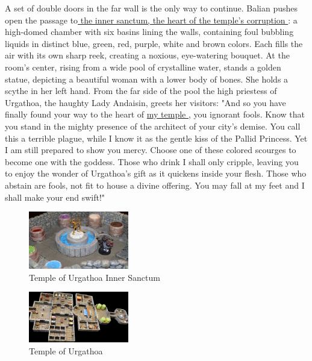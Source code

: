 A set of double doors in the far wall is the only way to continue. Balian pushes open the passage to\hyperref[fig:Temple-of-Urgathoa-Inner-Sanctum-523051443 ]{ the inner sanctum, the heart of the temple's corruption } : a high-domed chamber with six basins lining the walls, containing foul bubbling liquids in distinct blue, green, red, purple, white and brown colors. Each fills the air with its own sharp reek, creating a noxious, eye-watering bouquet. At the room's center, rising from a wide pool of crystalline water, stands a golden statue, depicting a beautiful woman with a lower body of bones. She holds a scythe in her left hand. From the far side of the pool the high priestess of Urgathoa, the haughty Lady Andaisin, greets her visitors: "And so you have finally found your way to the heart of \hyperref[fig:Temple-of-Urgathoa-523050074]{ my temple } , you ignorant fools. Know that you stand in the mighty presence of the architect of your city's demise. You call this a terrible plague, while I know it as the gentle kiss of the Pallid Princess. Yet I am still prepared to show you mercy. Choose one of these colored scourges to become one with the goddess. Those who drink I shall only cripple, leaving you to enjoy the wonder of Urgathoa's gift as it quickens inside your flesh. Those who abstain are fools, not fit to house a divine offering. You may fall at my feet and I shall make your end swift!" \\

\begin{figure}[h]
	\centering
	\includegraphics[width=0.39\textwidth]{images/Temple-of-Urgathoa-Inner-Sanctum-523051443 .jpg}
	\caption{Temple of Urgathoa Inner Sanctum}
	\label{fig:Temple-of-Urgathoa-Inner-Sanctum-523051443 }
\end{figure}

\begin{figure}[h]
	\centering
	\includegraphics[width=0.39\textwidth]{images/Temple-of-Urgathoa-523050074.jpg}
	\caption{Temple of Urgathoa}
	\label{fig:Temple-of-Urgathoa-523050074}
\end{figure}

